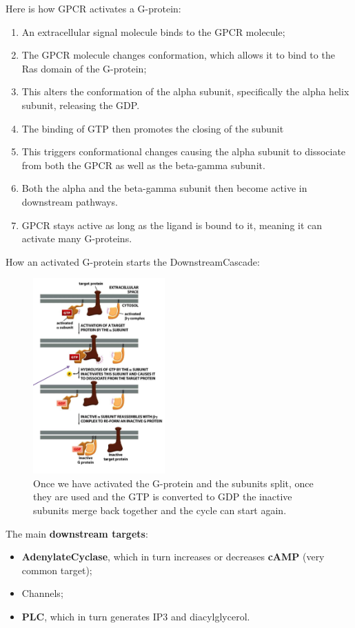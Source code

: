 \documentclass[../main.tex]{subfiles}
\begin{document}
Here is how GPCR activates a G-protein:
\begin{enumerate}
	\item An extracellular signal molecule binds to the GPCR molecule;
	\item The GPCR molecule changes conformation, which allows it to bind to the Ras domain of the G-protein;
	\item This alters the conformation of the alpha subunit, specifically the alpha helix subunit, releasing the GDP.
	\item The binding of GTP then promotes the closing of the subunit
	\item This triggers conformational changes causing the alpha subunit to dissociate from both the GPCR as well as the beta-gamma subunit.
	\item Both the alpha and the beta-gamma subunit then become active in downstream pathways.
	\item GPCR stays active as long as the ligand is bound to it, meaning it can activate many G-proteins.
\end{enumerate}

How an activated G-protein starts the \gls{DownstreamCascade}:
\begin{figure}[H]
	\centering
	\includegraphics[width=0.45\textwidth]{G_usage}
	\caption{Once we have activated the G-protein and the subunits split, once they are used and the GTP is converted to GDP the inactive subunits merge back together and the cycle can start again.}
\end{figure}

The main \textbf{downstream targets}: 
\begin{itemize}
	\item \textbf{\gls{AdenylateCyclase}}, which in turn increases or decreases \textbf{\gls{cAMP}} (very common target);
	\item Channels;
	\item \textbf{\gls{PLC}}, which in turn generates IP3 and diacylglycerol.
\end{itemize}
\end{document}
